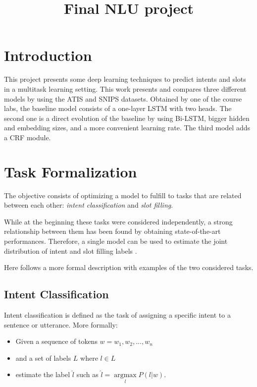 \documentclass[a4paper]{article}
\title{Final NLU project}
\begin{document}
\maketitle



\section{Introduction}
This project presents some deep learning techniques to predict intents and slots in a multitask learning setting. This work presents and compares three different models by using the ATIS and SNIPS datasets.
Obtained by one of the course labs, the baseline model consists of a one-layer LSTM with two heads. The second one is a direct evolution of the baseline by using Bi-LSTM, bigger hidden and embedding sizes, and a more convenient learning rate.
The third model adds a CRF module.

\section{Task Formalization}
The objective consists of optimizing a model to fulfill to tasks that are related between each other: \emph{intent classification} and \emph{slot filling}.

While at the beginning these tasks were considered independently, a strong relationship between them has been found by obtaining state-of-the-art performances. Therefore, a single model can be used to estimate the joint distribution of intent and slot filling labels \cite{DBLP:journals/corr/abs-2101-08091}.

Here follows a more formal description with examples of the two considered tasks.

\subsection{Intent Classification}
Intent classification is defined as the task of assigning a specific intent to a sentence or utterance.
More formally:
\begin{itemize}
    \item Given a sequence of tokens $w = {w_1, w_2, ..., w_n}$
    \item and a set of labels $L$ where $l \in L$
    \item estimate the label $\hat{l}$ such as $\hat{l} = \underset{l}{\operatorname{argmax}} P(l|w)$.
\end{itemize}
\end{document}
